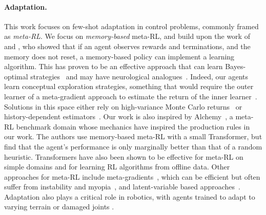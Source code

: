 \paragraph{Adaptation.} 
This work focuses on few-shot adaptation in control problems, commonly framed as \emph{meta-RL}. We focus on \emph{memory-based} meta-RL, and build upon the work of \citet{duan2017rl} and \citet{wang2016learning}, who showed that if an agent observes rewards and terminations, and the memory does not reset, a memory-based policy can implement a learning algorithm. This has proven to be an effective approach that can learn Bayes-optimal strategies~\citep{ortega2019metalearning,mikulik2020metatrained} and may have neurological analogues~\citep{wang2018prefrontal}. Indeed, our agents learn conceptual exploration strategies, something that would require the outer learner of a meta-gradient approach to estimate the return of the inner learner~\citep{stadie2018some}. Solutions in this space either rely on high-variance Monte Carlo returns~\citep{stadie2018some,garcia2019meta,vuorio2021no} or history-dependent estimators~\citep{zheng2020can}. Our work is also inspired by Alchemy~\citep{wang2102alchemy}, a meta-RL benchmark domain whose mechanics have inspired the production rules in our work. The authors use memory-based meta-RL with a small Transformer, but find that the agent's performance is only marginally better than that of a random heuristic. Transformers have also been shown to be effective for meta-RL on simple domains \citep{melo2022transformers} and for learning RL algorithms \citep{laskin2022algorithmdistillation} from offline data. Other approaches for meta-RL include meta-gradients~\citep{andrychowicz2016learning,maml_finn_icml17,xu2018meta, flennerhag2022bootstrapped}, which can be efficient but often suffer from instability and myopia~\citep{metz2021gradients,vuorio2021no,flennerhag2022bootstrapped}, and latent-variable based approaches~\citep{finn2018probabilistic,humplik2019meta,rakelly2019efficient,zintgraf2019varibad}. Adaptation also plays a critical role in robotics, with agents trained to adapt to varying terrain \citep{clavera2018learning, kumar2021rma} or damaged joints \citep{Cully2015RobotsTC}.

